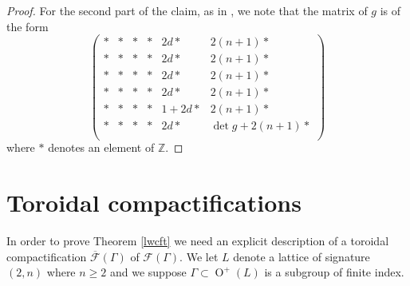 \documentclass[12pt, a4paper]{article}
\newcommand{\ZZ}{\mathbb{Z}}
\newcommand{\fc}{\mathcal{F}}
\newcommand{\opn}{\operatorname}
\begin{document}
\begin{proof}
For the second part of the claim, as in \cite{Brasch}, we note that the matrix of $g$ is of the form 
\[
\begin{pmatrix}
  * & * & * & * & 2d* & 2(n+1)* \\
  * & * & * & * & 2d*  & 2(n+1)* \\
  * & * & * & * & 2d* & 2(n+1)* \\
  * & * & * & * & 2d* & 2(n+1)* \\
  * & * & * & * & 1 + 2d* & 2(n+1)* \\
  * & * & * & * & 2d* & \opn{det}g + 2(n+1)*\\
\end{pmatrix}
\] 
where $*$ denotes an element of $\ZZ$.
\end{proof}
 \section{Toroidal compactifications}\label{toroidalsec}
In order to prove Theorem \ref{lwcft} we need an explicit description of a toroidal compactification $\overline{\fc}(\Gamma)$ of $\fc(\Gamma)$.
We let $L$ denote a lattice of signature $(2,n)$ where $n \geq 2$ and we suppose $\Gamma \subset \opn{O}^+(L)$ is a subgroup of finite index.
\end{document}
